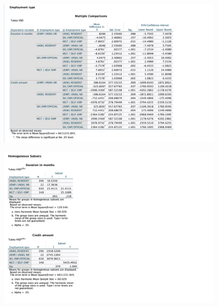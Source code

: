 \documentclass[english,10pt,a4paper]{article}
\begin{document}
	\begin{figure}[h]
		
		
		\includegraphics[width=1.2\linewidth]{Multiple comparison(emp type)}
	\end{figure}
	\begin{figure}[h]
		
		
		\includegraphics[width=1.2\linewidth]{post hoc test(emp type)}
	\end{figure}
	
\end{document}
